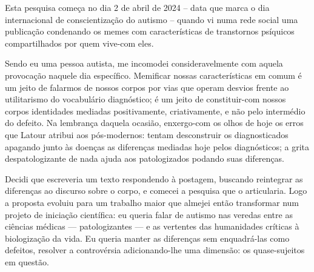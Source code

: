 

Esta pesquisa começa no dia 2 de abril de 2024 -- data que marca o dia internacional de conscientização do autismo -- quando vi  numa rede social uma publicação condenando os memes com características de transtornos psíquicos compartilhados por quem vive-com eles.

Sendo eu uma pessoa autista, me incomodei consideravelmente com aquela provocação naquele dia específico. Memificar nossas características em comum é um jeito de falarmos de nossos corpos por vias que operam desvios frente ao utilitarismo do vocabulário diagnóstico; é um jeito de constituir-com nossos corpos identidades mediadas positivamente, criativamente, e não pelo intermédio do defeito. Na lembrança daquela ocasião, enxergo-com os olhos de hoje os erros que Latour atribui aos pós-modernos: tentam desconstruir os diagnosticados apagando junto às doenças as diferenças mediadas hoje pelos diagnósticos; a grita despatologizante de nada ajuda aos patologizados podando suas diferenças.

Decidi que escreveria um texto respondendo à postagem, buscando reintegrar as diferenças ao discurso sobre o corpo, e comecei a pesquisa que o articularia. Logo a proposta evoluiu para um trabalho maior que almejei então transformar num projeto de iniciação científica: eu queria falar de autismo nas veredas entre as ciências médicas --- patologizantes --- e as vertentes das humanidades críticas à biologização da vida. Eu queria manter as diferenças sem enquadrá-las como defeitos, resolver a controvérsia adicionando-lhe uma dimensão: os quase-sujeitos em questão.

